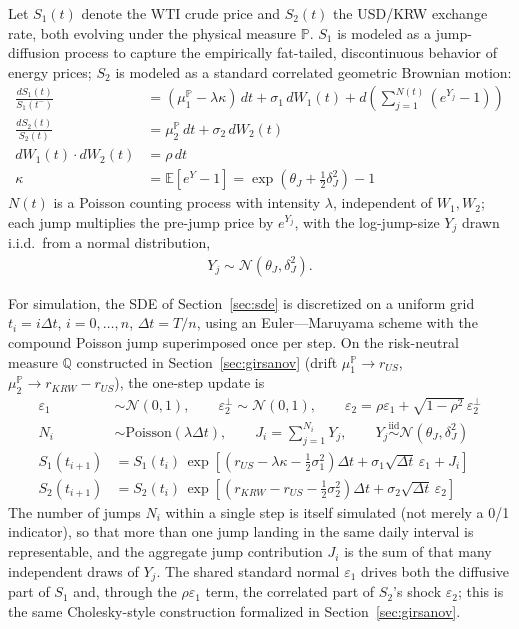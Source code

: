\documentclass[11pt,a4paper]{article}
\begin{document}
Let $S_1(t)$ denote the WTI crude price and $S_2(t)$ the USD/KRW exchange rate, both evolving under the physical measure $\mathbb{P}$. $S_1$ is modeled as a jump-diffusion process to capture the empirically fat-tailed, discontinuous behavior of energy prices; $S_2$ is modeled as a standard correlated geometric Brownian motion:
\begin{align}
\frac{dS_1(t)}{S_1(t^-)} &= (\mu_1^{\mathbb P}-\lambda\kappa)\,dt + \sigma_1\,dW_1(t) + d\!\left(\sum_{j=1}^{N(t)}(e^{Y_j}-1)\right) \\
\frac{dS_2(t)}{S_2(t)} &= \mu_2^{\mathbb P}\,dt + \sigma_2\,dW_2(t) \\
dW_1(t)\cdot dW_2(t) &= \rho\,dt \\
\kappa &= \mathbb E[e^{Y}-1] = \exp\!\left(\theta_J+\tfrac12\delta_J^2\right)-1
\end{align}
$N(t)$ is a Poisson counting process with intensity $\lambda$, independent of $W_1,W_2$; each jump multiplies the pre-jump price by $e^{Y_j}$, with the log-jump-size $Y_j$ drawn i.i.d.\ from a normal distribution,
\begin{align}
Y_j \sim \mathcal N(\theta_J,\delta_J^2).
\end{align}

For simulation, the SDE of Section~\ref{sec:sde} is discretized on a uniform grid $t_i=i\Delta t$, $i=0,\ldots,n$, $\Delta t = T/n$, using an Euler---Maruyama scheme with the compound Poisson jump superimposed once per step. On the risk-neutral measure $\mathbb Q$ constructed in Section~\ref{sec:girsanov} (drift $\mu_1^{\mathbb P}\to r_{US}$, $\mu_2^{\mathbb P}\to r_{KRW}-r_{US}$), the one-step update is
\begin{align}
\varepsilon_1 &\sim \mathcal N(0,1), \qquad \varepsilon_2^{\perp} \sim \mathcal N(0,1), \qquad \varepsilon_2 = \rho\varepsilon_1 + \sqrt{1-\rho^2}\,\varepsilon_2^{\perp} \\
N_i &\sim \mathrm{Poisson}(\lambda\Delta t), \qquad J_i = \sum_{j=1}^{N_i} Y_j, \qquad Y_j \overset{\text{iid}}{\sim} \mathcal N(\theta_J,\delta_J^2) \\
S_1(t_{i+1}) &= S_1(t_i)\,\exp\!\left[\left(r_{US}-\lambda\kappa-\tfrac12\sigma_1^2\right)\Delta t + \sigma_1\sqrt{\Delta t}\,\varepsilon_1 + J_i\right] \\
S_2(t_{i+1}) &= S_2(t_i)\,\exp\!\left[\left(r_{KRW}-r_{US}-\tfrac12\sigma_2^2\right)\Delta t + \sigma_2\sqrt{\Delta t}\,\varepsilon_2\right]
\end{align}
The number of jumps $N_i$ within a single step is itself simulated (not merely a 0/1 indicator), so that more than one jump landing in the same daily interval is representable, and the aggregate jump contribution $J_i$ is the sum of that many independent draws of $Y_j$. The shared standard normal $\varepsilon_1$ drives both the diffusive part of $S_1$ and, through the $\rho\varepsilon_1$ term, the correlated part of $S_2$'s shock $\varepsilon_2$; this is the same Cholesky-style construction formalized in Section~\ref{sec:girsanov}.
\end{document}

